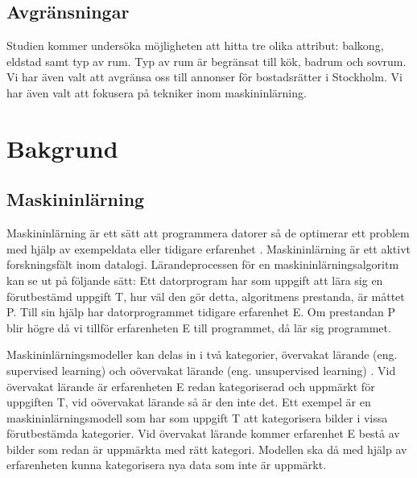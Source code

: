 \documentclass[]{kththesis}
\begin{document}
\section{Avgränsningar}
Studien kommer undersöka möjligheten att hitta tre olika attribut: balkong, eldstad samt typ av rum. Typ av rum är begränsat till kök, badrum och sovrum. Vi har även valt att avgränsa oss till annonser för bostadsrätter i Stockholm. Vi har även valt att fokusera på tekniker inom maskininlärning.

\chapter{Bakgrund}
\section{Maskininlärning}
Maskininlärning är ett sätt att programmera datorer så de optimerar ett problem med hjälp av exempeldata eller tidigare erfarenhet \parencite{alpaydin2009introduction}. Maskininlärning är ett aktivt forskningsfält inom datalogi. Lärandeprocessen för en maskininlärningsalgoritm kan se ut på följande sätt: Ett datorprogram har som uppgift att lära sig en förutbestämd uppgift T, hur väl den gör detta, algoritmens prestanda, är måttet P. Till sin hjälp har datorprogrammet tidigare erfarenhet E. Om prestandan P blir högre då vi tillför erfarenheten E till programmet, då lär sig programmet.

Maskininlärningsmodeller kan delas in i två kategorier, övervakat lärande (eng. supervised learning) och oövervakat lärande (eng. unsupervised learning) \parencite{murphy2012machine}. Vid övervakat lärande är erfarenheten E redan kategoriserad och uppmärkt för uppgiften T, vid oövervakat lärande så är den inte det. Ett exempel är en maskininlärningsmodell som har som uppgift T att kategorisera bilder i vissa förutbestämda kategorier. Vid övervakat lärande kommer erfarenhet E bestå av bilder som redan är uppmärkta med rätt kategori. Modellen ska då med hjälp av erfarenheten kunna kategorisera nya data som inte är uppmärkt. 
\end{document}

